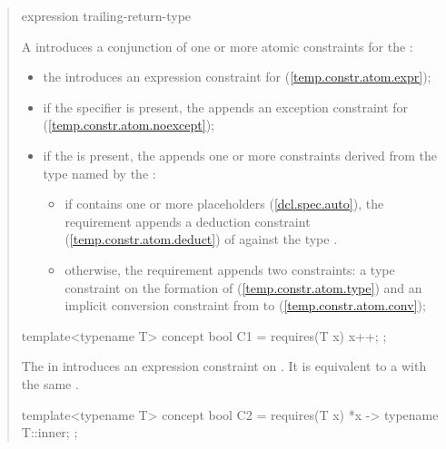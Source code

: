 \begin{quote}
\begin{bnf}
\br
  \terminal{\{} expression \terminal{\}} \opt 
    trailing-return-type\opt~\terminal{;}
\end{bnf}

\pnum
A  introduces 
a conjunction of one or more atomic constraints for the
 :
%
\begin{itemize}
\item the  introduces an expression 
constraint for  (\ref{temp.constr.atom.expr});

\item if the  specifier is present, the 
 appends an exception constraint for 
 (\ref{temp.constr.atom.noexcept});

\item if the  is present, the
 appends one or more constraints derived 
from the type  named by the :

\begin{itemize}
\item if  contains one or more placeholders (\ref{dcl.spec.auto}), 
the requirement appends a deduction constraint (\ref{temp.constr.atom.deduct}) 
of  against the type .

\item otherwise, the requirement appends two constraints:
a type constraint on the formation of  (\ref{temp.constr.atom.type}) and
an implicit conversion constraint from  to 
(\ref{temp.constr.atom.conv});
\end{itemize}
\end{itemize}
%
\enterexample
\begin{codeblock}
template<typename T> concept bool C1 =
  requires(T x) {
    {x++};
  };
\end{codeblock}
The  in  
introduces an expression constraint on .
It is equivalent to a 
with the same .

\begin{codeblock}
template<typename T> concept bool C2 =
  requires(T x) {
    {*x} -> typename T::inner;
  };
\end{codeblock}


\end{quote}
